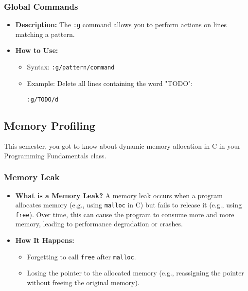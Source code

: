 \documentclass{article}
\begin{document}
\subsubsection{Global Commands}
\begin{itemize}
    \item \textbf{Description:} The \texttt{:g} command allows you to perform actions on lines matching a pattern.
    \item \textbf{How to Use:}
    \begin{itemize}
        \item Syntax: \texttt{:g/pattern/command}
        \item Example: Delete all lines containing the word "TODO":
        \begin{lstlisting}[language=bash]
        :g/TODO/d
        \end{lstlisting}
    \end{itemize}
\end{itemize}

\subsection{Memory Profiling}
This semester, you got to know about dynamic memory allocation in C in your Programming Fundamentals class.

\subsubsection{Memory Leak}
\begin{itemize}
    \item \textbf{What is a Memory Leak?}
    A memory leak occurs when a program allocates memory (e.g., using \texttt{malloc} in C) but fails to release it (e.g., using \texttt{free}). Over time, this can cause the program to consume more and more memory, leading to performance degradation or crashes.
    \item \textbf{How It Happens:}
    \begin{itemize}
        \item Forgetting to call \texttt{free} after \texttt{malloc}.
        \item Losing the pointer to the allocated memory (e.g., reassigning the pointer without freeing the original memory).
    \end{itemize}
\end{itemize}
\end{document}
